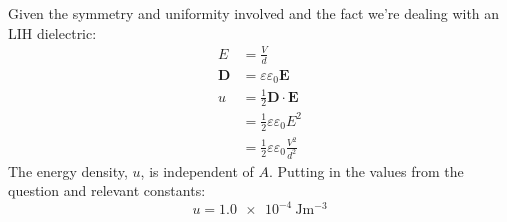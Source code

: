 Given the symmetry and uniformity involved and the fact we're dealing with an LIH dielectric:
\begin{align*}
    E & = \frac{V}{d}\\
    \mathbf{D} & = \varepsilon \varepsilon_0 \mathbf{E}\\
    u & = \tfrac{1}{2} \mathbf{D} \cdot \mathbf{E}\\
    & = \tfrac{1}{2} \varepsilon \varepsilon_0 E^2\\
    & = \tfrac{1}{2} \varepsilon \varepsilon_0 \frac{V^2}{d^2}
\end{align*}
The energy density, $ u $, is independent of $ A $. Putting in the values from the question and relevant constants:
\begin{equation*}
    u = \SI{1.0e-4}{\joule\metre\tothe{-3}}
\end{equation*}
